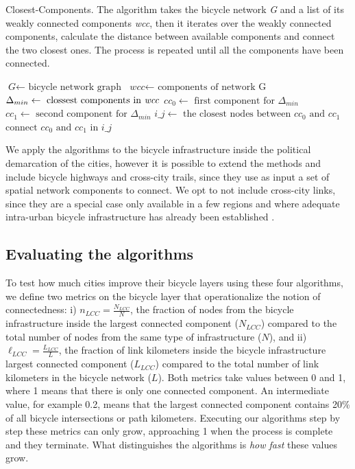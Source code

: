 \begin{algorithm}[h!]
  \caption{Closest-Components. The algorithm takes the bicycle network \textit{G} and a list of its weakly connected components \textit{wcc}, then it iterates over the weakly connected components, calculate the distance between available components and connect the two closest ones. The process is repeated until all the components have been connected.}\label{al:CC}
  \begin{algorithmic}[1]
    \State $\textit{G} \gets \text{ bicycle network graph}$
    \State $\textit{wcc} \gets \text{ components of network G}$
    \State $\Delta_{min} \gets \text{ clossest components in \textit{wcc}}$
    \State $cc_{0} \gets \text{ first component for }\Delta_{min}$
    \State $cc_{1} \gets \text{ second component for } \Delta_{min}$
    \State $\textit{i\_j} \gets \text{ the closest nodes between } cc_{0} \text{ and } cc_{1}$
    \State $\text{connect } cc_{0} \text{ and } cc_{1} \text{ in } i\_j$
    \EndFor
    \EndProcedure
  \end{algorithmic}
\end{algorithm}

We apply the algorithms to the bicycle infrastructure inside the political demarcation of the cities, however it is possible to extend the methods and include bicycle highways and cross-city trails, since they use as input a set of spatial network components to connect. We opt to not include cross-city links, since they are a special case only available in a few regions and where adequate intra-urban bicycle infrastructure has already been established \cite{Hildebrandt2013BicycleHighways,Taciuk2018Bicycle}.

\subsection{Evaluating the algorithms}

To test how much cities improve their bicycle layers using these four algorithms, we define two metrics on the bicycle layer that operationalize the notion of connectedness: i) $n_{LCC} = \frac{N_{LCC}}{N} $, the fraction of nodes from the bicycle infrastructure inside the largest connected component ($N_{LCC}$) compared to the total number of nodes from the same type of infrastructure ($N$), and ii) $\ell_{LCC} = \frac{L_{LCC}}{L} $, the fraction of link kilometers inside the bicycle infrastructure largest connected component ($L_{LCC}$) compared to the total number of link kilometers in the bicycle network ($L$). Both metrics take values between 0 and 1, where 1 means that there is only one connected component. An intermediate value, for example 0.2, means that the largest connected component contains 20\% of all bicycle intersections or path kilometers. Executing our algorithms step by step these metrics can only grow, approaching 1 when the process is complete and they terminate. What distinguishes the algorithms is \emph{how fast} these values grow.


